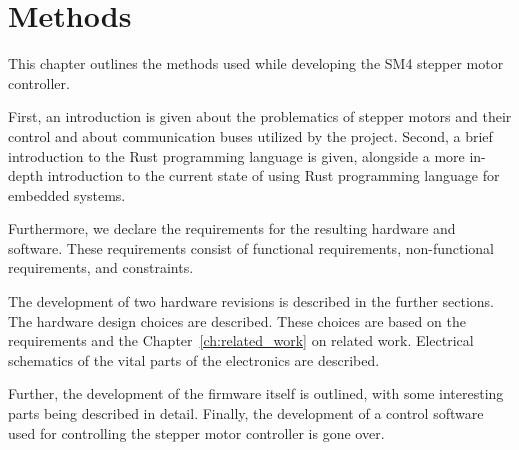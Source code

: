 \chapter{Methods}
\label{ch:methods}
This chapter outlines the methods used while developing the SM4 stepper motor controller.

First, an introduction is given about the problematics of stepper motors and their control and about communication buses utilized by the project.
Second, a brief introduction to the Rust programming language is given, alongside a more in-depth introduction to the current state of using Rust programming language for embedded systems.

Furthermore, we declare the requirements for the resulting hardware and software.
These requirements consist of functional requirements, non-functional requirements, and constraints.

The development of two hardware revisions is described in the further sections.
The hardware design choices are described.
These choices are based on the requirements and the Chapter~\ref{ch:related_work} on related work.
Electrical schematics of the vital parts of the electronics are described.

Further, the development of the firmware itself is outlined, with some interesting parts being described in detail.
Finally, the development of a control software used for controlling the stepper motor controller is gone over.
